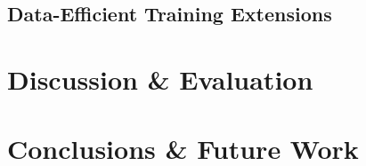 \documentclass[a4paper, 11pt]{report}
\begin{document}
    \section{Data-Efficient Training Extensions}
    \label{section: data-extensions}


    \newpage
    \chapter{Discussion \& Evaluation}
    \label{chapter: evaluation}

    \newpage
    \chapter{Conclusions \& Future Work}
    \label{chapter: conclusion}



    \newpage
    
\end{document}
